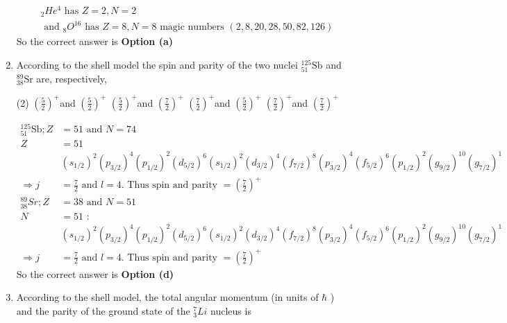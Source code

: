 \begin{enumerate}
\begin{answer}
\begin{align*}
		&{ }_2 H e^4\text{ has }Z=2, N=2\\
		&\text{	and }{ }_8 O^{16}\text{ has $Z=8, N=8$ magic numbers $(2,8,20,28,50,82,126)$}
		\end{align*}
		So the correct answer is \textbf{Option (a)}
	\end{answer}
	\item  According to the shell model the spin and parity of the two nuclei ${ }_{51}^{125} \mathrm{Sb}$ and ${ }_{38}^{89} \mathrm{Sr}$ are, respectively,
	{}
	\begin{tasks}(2)
		\task[\textbf{a.}]$\left(\frac{5}{2}\right)^{+}$and $\left(\frac{5}{2}\right)^{+}$
		\task[\textbf{b.}]$\left(\frac{5}{2}\right)^{+}$and $\left(\frac{7}{2}\right)^{+}$
		\task[\textbf{c.}]$\left(\frac{7}{2}\right)^{+}$and $\left(\frac{5}{2}\right)^{+}$
		\task[\textbf{d.}] $\left(\frac{7}{2}\right)^{+}$and $\left(\frac{7}{2}\right)^{+}$
	\end{tasks}
	\begin{answer}
		\begin{align*}
		{ }_{51}^{125} \mathrm{Sb} ; Z&=51 \text { and } N=74\\
		Z&=51 \\
		&\left(s_{1 / 2}\right)^2\left(p_{3 / 2}\right)^4\left(p_{1 / 2}\right)^2\left(d_{5 / 2}\right)^6\left(s_{1 / 2}\right)^2\left(d_{3 / 2}\right)^4\left(f_{7 / 2}\right)^8\left(p_{3 / 2}\right)^4\left(f_{5 / 2}\right)^6\left(p_{1 / 2}\right)^2\left(g_{9 / 2}\right)^{10}\left(g_{7 / 2}\right)^1 \\
		\Rightarrow j&=\frac{7}{2} \text { and } l=4 \text {. Thus spin and parity }=\left(\frac{7}{2}\right)^{+} \\
		{ }_{38}^{89} S r ; Z&=38 \text { and } N=51 \\
		N&=51 \text { : } \\
		&\left(s_{1 / 2}\right)^2\left(p_{3 / 2}\right)^4\left(p_{1 / 2}\right)^2\left(d_{5 / 2}\right)^6\left(s_{1 / 2}\right)^2\left(d_{3 / 2}\right)^4\left(f_{7 / 2}\right)^8\left(p_{3 / 2}\right)^4\left(f_{5 / 2}\right)^6\left(p_{1 / 2}\right)^2\left(g_{9 / 2}\right)^{10}\left(g_{7 / 2}\right)^1 \\
		\Rightarrow j&=\frac{7}{2} \text { and } l=4 \text {. Thus spin and parity }=\left(\frac{7}{2}\right)^{+}
		\end{align*}
		So the correct answer is \textbf{Option (d)}
	\end{answer}
	\item  According to the shell model, the total angular momentum (in units of $\hbar$ ) and the parity of the ground state of the ${ }_3^7 L i$ nucleus is

\end{enumerate}
